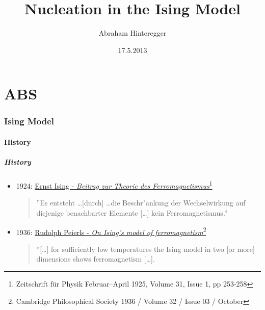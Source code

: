 \documentclass{beamer}
\begin{document}
\part{ABS}
\title{Nucleation in the Ising Model}
\author{Abraham Hinteregger}
\date{17.5.2013}
\titlepage

 \setcounter{tocdepth}{4}




\section{Ising Model} 
\subsection{History}
\begin{frame}\frametitle{History} 
\begin{block}{}
\begin{itemize}%
\item 1924: \href{http://link.springer.com/content/pdf/10.1007 BF02980577.pdf}{Ernst Ising - \textit{Beitrag zur Theorie des Ferromagnetismus}\footnote{Zeitschrift für Physik Februar–April 1925, Volume 31, Issue 1, pp 253-258 }}
\begin{quote}
''Es entsteht \ldots [durch] \ldots die Beschr"ankung der Wechselwirkung auf diejenige  benachbarter Elemente [\ldots] kein Ferromagnetismus.''
\end{quote}
\item 1936: \href{http://journals.cambridge.org/action/displayAbstract?fromPage=online\&aid=2027260}{Rudolph Peierls - \textit{On Ising's model of ferromagnetism}\footnote{Cambridge Philosophical Society 1936 / Volume 32 / Issue 03 / October}}
\begin{quote}
''[\ldots] for sufficiently low temperatures the Ising model in two [or more] dimensions shows ferromagnetism [\ldots].
\end{quote}
\end{itemize}
\end{block}
\end{frame}
\end{document}
